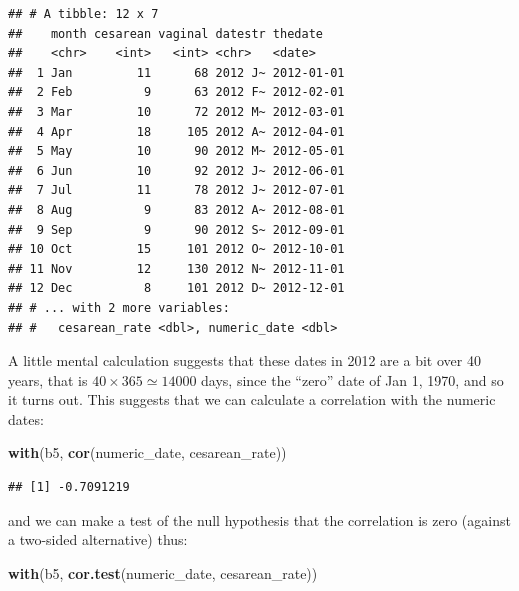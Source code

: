 \documentclass[]{tufte-book}
\newenvironment{Shaded}{}{}
\newcommand{\DataTypeTok}[1]{\textcolor[rgb]{0.56,0.13,0.00}{#1}}
\newcommand{\KeywordTok}[1]{\textcolor[rgb]{0.00,0.44,0.13}{\textbf{#1}}}
\newcommand{\NormalTok}[1]{#1}
\newcommand{\OperatorTok}[1]{\textcolor[rgb]{0.40,0.40,0.40}{#1}}
\newcommand{\StringTok}[1]{\textcolor[rgb]{0.25,0.44,0.63}{#1}}
\theoremstyle{definition}
\theoremstyle{definition}
\theoremstyle{definition}
\theoremstyle{remark}
\begin{document}
\begin{Shaded}
\end{Shaded}

\begin{verbatim}
## # A tibble: 12 x 7
##    month cesarean vaginal datestr thedate   
##    <chr>    <int>   <int> <chr>   <date>    
##  1 Jan         11      68 2012 J~ 2012-01-01
##  2 Feb          9      63 2012 F~ 2012-02-01
##  3 Mar         10      72 2012 M~ 2012-03-01
##  4 Apr         18     105 2012 A~ 2012-04-01
##  5 May         10      90 2012 M~ 2012-05-01
##  6 Jun         10      92 2012 J~ 2012-06-01
##  7 Jul         11      78 2012 J~ 2012-07-01
##  8 Aug          9      83 2012 A~ 2012-08-01
##  9 Sep          9      90 2012 S~ 2012-09-01
## 10 Oct         15     101 2012 O~ 2012-10-01
## 11 Nov         12     130 2012 N~ 2012-11-01
## 12 Dec          8     101 2012 D~ 2012-12-01
## # ... with 2 more variables:
## #   cesarean_rate <dbl>, numeric_date <dbl>
\end{verbatim}

A little mental calculation suggests that these dates in 2012 are a bit
over 40 years, that is \(40 \times 365 \simeq 14000\) days, since the
``zero'' date of Jan 1, 1970, and so it turns out. This suggests that we
can calculate a correlation with the numeric dates:

\begin{Shaded}
\begin{Highlighting}[]
\KeywordTok{with}\NormalTok{(b5, }\KeywordTok{cor}\NormalTok{(numeric_date, cesarean_rate))}
\end{Highlighting}
\end{Shaded}

\begin{verbatim}
## [1] -0.7091219
\end{verbatim}

and we can make a test of the null hypothesis that the correlation is
zero (against a two-sided alternative) thus:

\begin{Shaded}
\begin{Highlighting}[]
\KeywordTok{with}\NormalTok{(b5, }\KeywordTok{cor.test}\NormalTok{(numeric_date, cesarean_rate))}
\end{Highlighting}
\end{Shaded}
\end{document}
